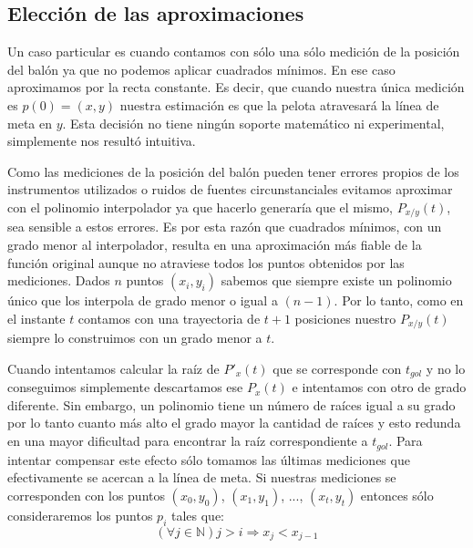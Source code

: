 \subsection{Elección de las aproximaciones}
Un caso particular es cuando contamos con sólo una sólo medición de la posición del balón ya que no podemos aplicar cuadrados mínimos. En
ese caso aproximamos por la recta constante. Es decir, que cuando nuestra única medición es $p(0) = (x, y)$ nuestra estimación es que la 
pelota atravesará la línea de meta en $y$. Esta decisión no tiene ningún soporte matemático ni experimental, simplemente nos resultó
intuitiva.
\par
Como las mediciones de la posición del balón pueden tener errores propios de los instrumentos utilizados o ruidos de fuentes circunstanciales
evitamos aproximar con el polinomio interpolador ya que hacerlo generaría que el mismo, $P_{x/y}(t)$, sea sensible a estos errores. Es por esta
razón que cuadrados mínimos, con un grado menor al interpolador, resulta en una aproximación más fiable de la función original aunque 
no atraviese todos los puntos obtenidos por las mediciones. Dados $n$ puntos $(x_i, y_i)$ sabemos que siempre existe un polinomio único 
que los interpola de grado menor o igual a $(n-1)$. Por lo tanto, como en el instante $t$ contamos con una trayectoria de $t+1$
posiciones nuestro $P_{x/y}(t)$ siempre lo construimos con un grado menor a $t$.
\par
Cuando intentamos calcular la raíz de $P'_x(t)$ que se corresponde con $t_{gol}$ y no lo conseguimos simplemente descartamos ese $P_x(t)$
e intentamos con otro de grado diferente. Sin embargo, un polinomio tiene un número de raíces igual a su grado por lo tanto cuanto más 
alto el grado mayor la cantidad de raíces y esto redunda en una mayor dificultad para encontrar la raíz correspondiente a $t_{gol}$. Para
intentar compensar este efecto sólo tomamos las últimas mediciones que efectivamente se acercan a la línea de meta. Si nuestras mediciones
se corresponden con los puntos $(x_0, y_0)$, $(x_1, y_1)$, ..., $(x_t, y_t)$ entonces sólo consideraremos los puntos $p_i$ tales que:
\begin{displaymath}
 (\forall j \in \mathbb{N}) j > i \Rightarrow x_j < x_{j-1}
\end{displaymath}

